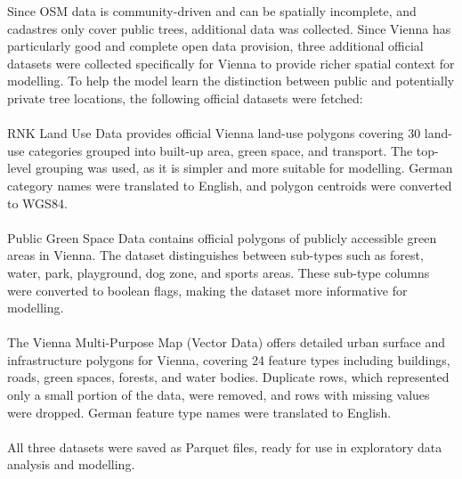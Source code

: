 Since OSM data is community-driven and can be spatially incomplete, and cadastres only cover public trees, additional data was collected. Since Vienna has particularly good and complete open data provision, three additional official datasets were collected specifically for Vienna to provide richer spatial context for modelling. To help the model learn the distinction between public and potentially private tree locations, the following official datasets were fetched:\\
\\
RNK Land Use Data \cite{landuse} provides official Vienna land-use polygons covering 30 land-use categories grouped into built-up area, green space, and transport. The top-level grouping was used, as it is simpler and more suitable for modelling. German category names were translated to English, and polygon centroids were converted to WGS84.\\
\\
Public Green Space Data \cite{greenspace} contains official polygons of publicly accessible green areas in Vienna. The dataset distinguishes between sub-types such as forest, water, park, playground, dog zone, and sports areas. These sub-type columns were converted to boolean flags, making the dataset more informative for modelling.\\
\\
The Vienna Multi-Purpose Map (Vector Data) \cite{multipurposemap} offers detailed urban surface and infrastructure polygons for Vienna, covering 24 feature types including buildings, roads, green spaces, forests, and water bodies. Duplicate rows, which represented only a small portion of the data, were removed, and rows with missing values were dropped. German feature type names were translated to English.\\
\\
All three datasets were saved as Parquet files, ready for use in exploratory data analysis and modelling.

